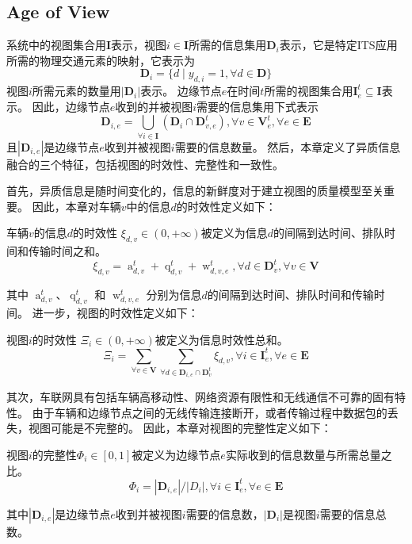 \subsection{Age of View}
系统中的视图集合用$\mathbf{I}$表示，视图$i \in \mathbf{I}$所需的信息集用$\mathbf{D}_{i}$表示，它是特定ITS应用所需的物理交通元素的映射，它表示为
\begin{equation}
	\mathbf{D}_{i} = \{d \mid y_{d, i} = 1, \forall d \in \mathbf{D} \}
\end{equation}
视图$i$所需元素的数量用$|\mathbf{D}_{i}|$表示。
边缘节点$e$在时间$t$所需的视图集合用$\mathbf{I}_e^t \subseteq \mathbf{I}$表示。
因此，边缘节点$e$收到的并被视图$i$需要的信息集用下式表示
\begin{equation}
    \mathbf{D}_{i, e}=\bigcup_{\forall i \in \mathbf{I}}\left(\mathbf{D}_i \cap \mathbf{D}_{v, e}^t\right), \forall v \in \mathbf{V}_e^t, \forall e \in \mathbf{E}
\end{equation}
且$| \mathbf{D}_{i, e} |$是边缘节点$e$收到并被视图$i$需要的信息数量。
然后，本章定义了异质信息融合的三个特征，包括视图的时效性、完整性和一致性。

首先，异质信息是随时间变化的，信息的新鲜度对于建立视图的质量模型至关重要。
因此，本章对车辆$v$中的信息$d$的时效性定义如下：
\begin{definition}
	车辆$v$的信息$d$的时效性 $\xi_{d,v} \in (0, +\infty)$被定义为信息$d$的间隔到达时间、排队时间和传输时间之和。
	\begin{equation}
    	\xi_{d, v} = \operatorname{a}_{d, v}^t + \operatorname{q}_{d, v}^t + \operatorname{w}_{d, v, e}^t, \forall d \in \mathbf{D}_v^t, \forall v \in \mathbf{V}
	\end{equation}
\end{definition}
\noindent 其中 $\operatorname{a}_{d, v}^t$、$\operatorname{q}_{d, v}^t$ 和 $\operatorname{w}_{d, v, e}^t$ 分别为信息$d$的间隔到达时间、排队时间和传输时间。
进一步，视图的时效性定义如下：
\begin{definition}
视图$i$的时效性 $\Xi_{i} \in (0,+\infty)$被定义为信息时效性总和。
	\begin{equation}
    	\Xi_{i} = \sum_{\forall v \in \mathbf{V}} \sum_{\forall d \in \mathbf{D}_{i, e} \cap \mathbf{D}_v^t } \xi_{d, v}, \forall i \in \mathbf{I}_e^t, \forall e \in \mathbf{E}
	\end{equation}
\end{definition}

其次，车联网具有包括车辆高移动性、网络资源有限性和无线通信不可靠的固有特性。
由于车辆和边缘节点之间的无线传输连接断开，或者传输过程中数据包的丢失，视图可能是不完整的。
因此，本章对视图的完整性定义如下：
\begin{definition}
	视图$i$的完整性$\Phi_{i} \in [0,1]$被定义为边缘节点$e$实际收到的信息数量与所需总量之比。
	\begin{equation}
	\Phi_{i}= {| \mathbf{D}_{i, e} |} \big/ {|D_{i} |}, \forall i \in \mathbf{I}_e^t, \forall e \in \mathbf{E}
	\end{equation}
\end{definition}
\noindent 其中$|\mathbf{D}_{i, e}|$是边缘节点$e$收到并被视图$i$需要的信息数，$|\mathbf{D}_{i}|$是视图$i$需要的信息总数。

